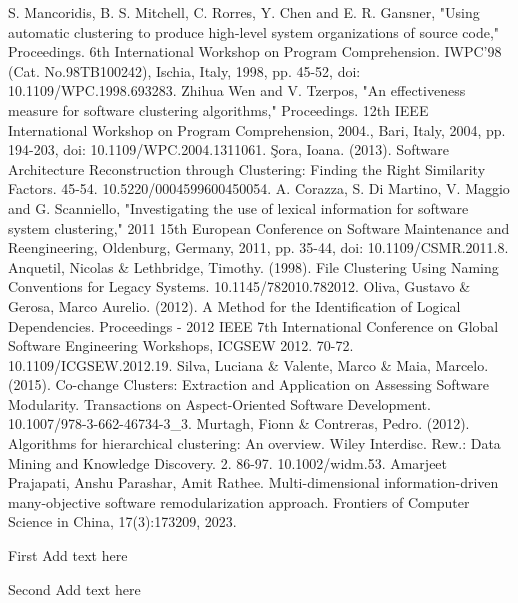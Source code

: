 \documentclass{ieeeaccess}
\begin{document}
\begin{thebibliography}{00}
 S. Mancoridis, B. S. Mitchell, C. Rorres, Y. Chen and E. R. Gansner, "Using automatic clustering to produce high-level system organizations of source code," Proceedings. 6th International Workshop on Program Comprehension. IWPC'98 (Cat. No.98TB100242), Ischia, Italy, 1998, pp. 45-52, doi: 10.1109/WPC.1998.693283.
 Zhihua Wen and V. Tzerpos, "An effectiveness measure for software clustering algorithms," Proceedings. 12th IEEE International Workshop on Program Comprehension, 2004., Bari, Italy, 2004, pp. 194-203, doi: 10.1109/WPC.2004.1311061.
 Şora, Ioana. (2013). Software Architecture Reconstruction through Clustering: Finding the Right Similarity Factors. 45-54. 10.5220/0004599600450054. 
 A. Corazza, S. Di Martino, V. Maggio and G. Scanniello, "Investigating the use of lexical information for software system clustering," 2011 15th European Conference on Software Maintenance and Reengineering, Oldenburg, Germany, 2011, pp. 35-44, doi: 10.1109/CSMR.2011.8.
 Anquetil, Nicolas \& Lethbridge, Timothy. (1998). File Clustering Using Naming Conventions for Legacy Systems. 10.1145/782010.782012. 
 Oliva, Gustavo \& Gerosa, Marco Aurelio. (2012). A Method for the Identification of Logical Dependencies. Proceedings - 2012 IEEE 7th International Conference on Global Software Engineering Workshops, ICGSEW 2012. 70-72. 10.1109/ICGSEW.2012.19. 
 Silva, Luciana \& Valente, Marco \& Maia, Marcelo. (2015). Co-change Clusters: Extraction and Application on Assessing Software Modularity. Transactions on Aspect-Oriented Software Development. 10.1007/978-3-662-46734-3\_3. 
 Murtagh, Fionn \& Contreras, Pedro. (2012). Algorithms for hierarchical clustering: An overview. Wiley Interdisc. Rew.: Data Mining and Knowledge Discovery. 2. 86-97. 10.1002/widm.53. 
 Amarjeet Prajapati, Anshu Parashar, Amit Rathee. Multi-dimensional information-driven many-objective software remodularization approach. Frontiers of Computer Science in China, 17(3):173209, 2023.


\end{thebibliography}

\begin{IEEEbiographynophoto}{First} Add text here
\end{IEEEbiographynophoto}

\begin{IEEEbiographynophoto}{Second} Add text here
\end{IEEEbiographynophoto}

\EOD
\end{document}
